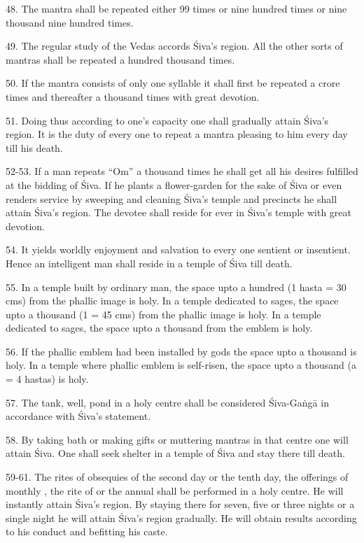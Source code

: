 48. The  mantra shall be repeated either 99 times or nine hundred
times or nine thousand nine hundred times.

49. The regular study of the Vedas accords Śiva’s region. All the other sorts of
mantras shall be repeated a hundred thousand times.

50. If the mantra consists of only one syllable it shall first be repeated
a crore times and thereafter a thousand times with great devotion.

51. Doing thus according to one’s capacity one shall gradually attain Śiva’s
region. It is the duty of every one to repeat a mantra pleasing to him every day
till his death.

52-53. If a man repeats “Om” a thousand times he shall get all his desires
fulfilled at the bidding of Śiva. If he plants a flower-garden for the sake of
Śiva or even renders service by sweeping and cleaning Śiva’s temple and
precincts he shall attain Śiva’s region. The devotee shall reside for ever in
Śiva’s temple with great devotion.

54. It yields worldly enjoyment and salvation to every one sentient or
insentient. Hence an intelligent man shall reside in a temple of Śiva till
death.

55. In a temple built by ordinary man, the space upto a hundred  (1
hasta = 30 cms) from the phallic image is holy. In a temple dedicated to sages,
the space upto a thousand  (1  = 45 cms) from the phallic
image is holy. In a temple dedicated to sages, the space upto a thousand
 from the emblem is holy.

56. If the phallic emblem had been installed by gods the space upto a thousand
 is holy. In a temple where phallic emblem is self-risen, the space
upto a thousand  (a  = 4 hastas) is holy.

57. The tank, well, pond \etc in a holy centre shall be considered Śiva-Gaṅgā in
accordance with Śiva’s statement.

58. By taking bath or making gifts or muttering mantras in that centre one will
attain Śiva. One shall seek shelter in a temple of Śiva and stay there till
death.

59-61. The rites of obsequies of the second day or the tenth day, the offerings
of monthly , the rite of  or the annual 
shall be performed in a holy centre. He will instantly attain Śiva’s region. By
staying there for seven, five or three nights or a single night he will attain
Śiva’s region gradually. He will obtain results according to his conduct and
befitting his caste.

